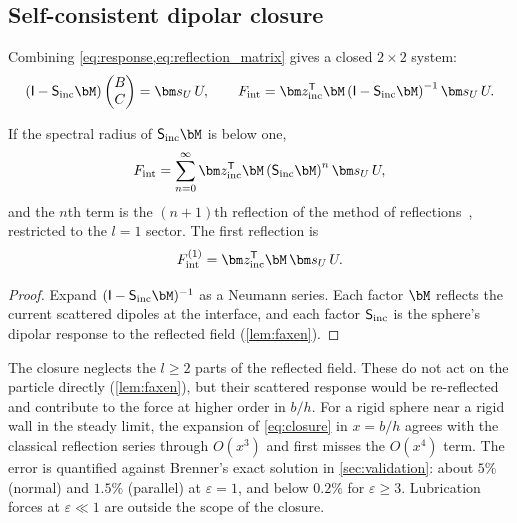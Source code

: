 \subsection{Self-consistent dipolar closure}\label{sec:closure}
Combining \cref{eq:response,eq:reflection_matrix} gives a closed $2\times2$ system:
\begin{equation}
  \left(\mathsf I-\mathsf S_{\rm inc}\bM\right)\begin{pmatrix}B\\ C\end{pmatrix}=\bm s_U\,U,
  \qquad
  F_{\rm int}=\bm z_{\rm inc}^{\mathsf T}\bM\left(\mathsf I-\mathsf S_{\rm inc}\bM\right)^{-1}\bm s_U\,U .
  \label{eq:closure}
\end{equation}
\begin{proposition}\label{prop:series}
If the spectral radius of $\mathsf S_{\rm inc}\bM$ is below one,
\begin{equation}
  F_{\rm int}=\sum_{n=0}^{\infty}\bm z_{\rm inc}^{\mathsf T}\bM\left(\mathsf S_{\rm inc}\bM\right)^{n}\bm s_U\,U,
  \label{eq:series}
\end{equation}
and the $n$th term is the $(n+1)$th reflection of the method of reflections~\cite{simha2018unsteady}, restricted to the
$l=1$ sector. The first reflection is
\begin{equation}
  F^{(1)}_{\rm int}=\bm z_{\rm inc}^{\mathsf T}\bM\,\bm s_U\,U .
  \label{eq:first_reflection}
\end{equation}
\end{proposition}
\begin{proof}
Expand $(\mathsf I-\mathsf S_{\rm inc}\bM)^{-1}$ as a Neumann series. Each factor $\bM$ reflects the current
scattered dipoles at the interface, and each factor $\mathsf S_{\rm inc}$ is the sphere's dipolar response to the
reflected field (\cref{lem:faxen}).
\end{proof}

\begin{remark}[Accuracy]\label{rem:accuracy}
The closure neglects the $l\ge2$ parts of the reflected field. These do not act on the particle directly
(\cref{lem:faxen}), but their scattered response would be re-reflected and contribute to the force at higher order in
$b/h$. For a rigid sphere near a rigid wall in the steady limit, the expansion of \cref{eq:closure} in $x=b/h$ agrees with
the classical reflection series through $O(x^3)$ and first misses the $O(x^4)$ term. The error is quantified against
Brenner's exact solution in \cref{sec:validation}: about $5\%$ (normal) and $1.5\%$ (parallel) at $\varepsilon=1$, and
below $0.2\%$ for $\varepsilon\ge3$. Lubrication forces at $\varepsilon\ll1$ are outside the scope of the closure.
\end{remark}

